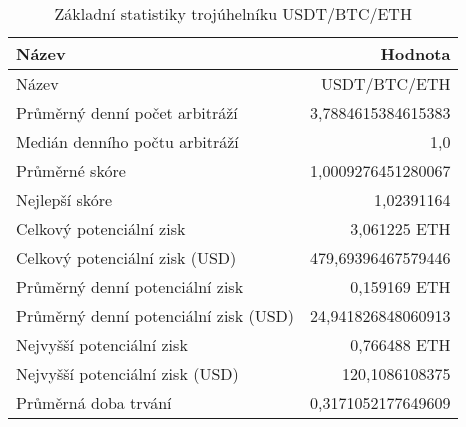 \begin{table}\centering
\caption{Základní statistiky trojúhelníku USDT/BTC/ETH}
\label{USDTBTCETH_stats}
\begin{tabular}{|| l | r ||}
\hline Název & Hodnota \\ 
\hline\hline Název & USDT/BTC/ETH \\ 
\hline Průměrný denní počet arbitráží & 3,7884615384615383 \\ 
\hline Medián denního počtu arbitráží & 1,0 \\ 
\hline Průměrné skóre & 1,0009276451280067 \\ 
\hline Nejlepší skóre & 1,02391164 \\ 
\hline Celkový potenciální zisk & 3,061225 ETH \\ 
\hline Celkový potenciální zisk (USD) & 479,69396467579446 \\ 
\hline Průměrný denní potenciální zisk & 0,159169 ETH \\ 
\hline Průměrný denní potenciální zisk (USD) & 24,941826848060913 \\ 
\hline Nejvyšší potenciální zisk & 0,766488 ETH \\ 
\hline Nejvyšší potenciální zisk (USD) & 120,1086108375 \\ 
\hline Průměrná doba trvání & 0,3171052177649609 \\ 
\hline
\end{tabular}
\end{table}